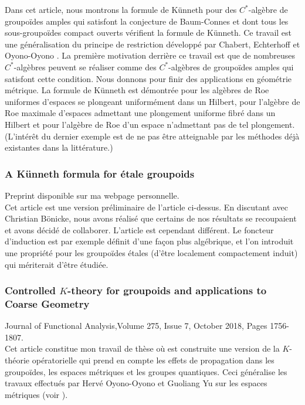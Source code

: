 \documentclass[a4paper,11pt]{article}
\begin{document}
Dans cet article, nous montrons la formule de K\"unneth pour des $C^*$-alg\`ebre de groupo\"ides amples qui satisfont la conjecture de Baum-Connes et dont tous les sous-groupo\"ides compact ouverts v\'erifient la formule de K\"unneth. Ce travail est une g\'en\'eralisation du principe de restriction d\'evelopp\'e par Chabert, Echterhoff et Oyono-Oyono \cite{ChabertEOY}. La premi\`ere motivation derri\`ere ce travail est que de nombreuses $C^*$-alg\`ebres peuvent se r\'ealiser comme des $C^*$-alg\`ebres de groupo\"ides amples qui satisfont cette condition. Nous donnons pour finir des applications en g\'eom\'etrie m\'etrique. La formule de K\"unneth est d\'emontr\'ee pour les alg\`ebres de Roe uniformes d'espaces se plongeant uniform\'ement dans un Hilbert, pour l'alg\`ebre de Roe maximale d'espaces admettant une plongement uniforme fibr\'e dans un Hilbert et pour l'alg\`ebre de Roe d'un espace n'admettant pas de tel plongement. (L'int\'er\^et du dernier exemple est de ne pas \^etre atteignable par les m\'ethodes d\'ej\`a existantes dans la litt\'erature.)  

\subsubsection*{A K\"{u}nneth formula for \'etale groupoids} Preprint disponible sur ma webpage personnelle.\\

Cet article est une version pr\'eliminaire de l'article ci-dessus. En discutant avec Christian B\"onicke, nous avons r\'ealis\'e que certains de nos r\'esultats se recoupaient et avons d\'ecid\'e de collaborer. L'article est cependant diff\'erent. Le foncteur d'induction est par exemple d\'efinit d'une fa\c{c}on plus alg\'ebrique, et l'on introduit une propri\'et\'e pour les groupo\"ides \'etales (d'\^etre localement compactement induit) qui m\'eriterait d'\^etre \'etudi\'ee.

\subsubsection*{Controlled $K$-theory for groupoids and applications to Coarse Geometry} 

Journal of Functional Analysis,Volume 275, Issue 7, October 2018, Pages 1756-1807.\\	 

Cet article constitue mon travail de th\`ese o\`u est construite une version de la $K$-th\'eorie op\'eratorielle qui prend en compte les effets de propagation dans les groupo\"ides, les espaces m\'etriques et les groupes quantiques. Ceci g\'en\'eralise les travaux effectu\'es par Herv\'e Oyono-Oyono et Guoliang Yu sur les espaces m\'etriques (voir \cite{OY1}\cite{OY2}\cite{OY3}\cite{oyono2019quantitative}). \\
\end{document}
